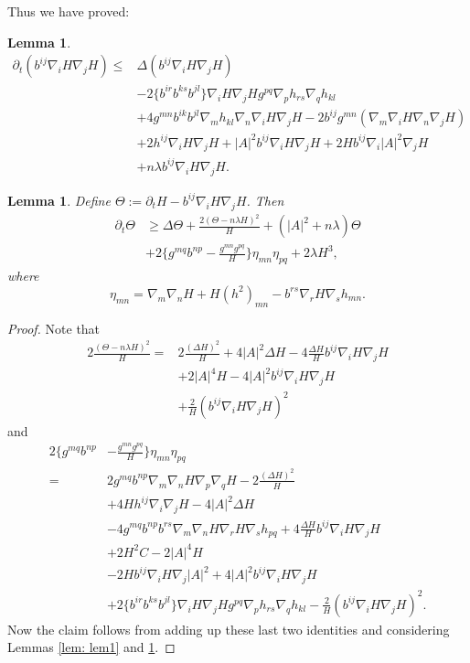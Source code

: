 \documentclass{amsart}
\newtheorem{lemma}[theorem]{Lemma}
\theoremstyle{definition}
\theoremstyle{remark}
\numberwithin{equation}{section}
\begin{document}
Thus we have proved:
\begin{lemma}\label{lem: lem2}
\begin{align*}
\partial_t(b^{ij}\nabla_iH\nabla_jH)\leq &\Delta (b^{ij}\nabla_iH\nabla_jH)\\
&-2\{b^{ir}b^{ks}b^{jl}\}\nabla_iH\nabla_jHg^{pq}\nabla_ph_{rs}\nabla_qh_{kl}\\
&+4g^{mn}b^{ik}b^{jl}\nabla_mh_{kl}\nabla_n\nabla_iH\nabla_jH-2b^{ij}g^{mn}(\nabla_m\nabla_iH\nabla_n\nabla_jH)\\
&+2h^{ij}\nabla_iH\nabla_jH+|A|^2b^{ij}\nabla_iH\nabla_jH+2Hb^{ij}\nabla_i|A|^2\nabla_jH\\
&+n\lambda b^{ij}\nabla_iH\nabla_jH.
\end{align*}
\end{lemma}
\begin{lemma}\label{lem: lema6}
Define $\Theta:=\partial_tH-b^{ij}\nabla_iH\nabla_jH$. Then
\begin{align*}
\partial_t\Theta&\geq\Delta \Theta+ \frac{2(\Theta-n\lambda H)^2}{H}+(|A|^2+n\lambda )\Theta\\
&+2\{g^{mq}b^{np}-\frac{g^{mn}g^{pq}}{H}\}\eta_{mn}\eta_{pq}+2\lambda H^3,
\end{align*}
where
\[\eta_{mn}=\nabla_m\nabla_nH+H(h^2)_{mn}-b^{rs}\nabla_rH\nabla_sh_{mn}.\]
\end{lemma}
\begin{proof}
Note that
\begin{align*}
2\frac{(\Theta-n\lambda H)^2}{H}=&2\frac{(\Delta H)^2}{H}+4|A|^2\Delta H-4\frac{\Delta H}{H}b^{ij}\nabla_iH\nabla_jH\\
&+2|A|^4H-4|A|^2b^{ij}\nabla_iH\nabla_jH\\
&+\frac{2}{H}\left(b^{ij}\nabla_iH\nabla_jH\right)^2
\end{align*}
and
\begin{align*}
2\{g^{mq}b^{np}&-\frac{g^{mn}g^{pq}}{H}\}\eta_{mn}\eta_{pq}\\
=&2g^{mq}b^{np}\nabla_m\nabla_nH\nabla_p\nabla_qH-2\frac{(\Delta H)^2}{H}\\
&+4Hh^{ij}\nabla_i\nabla_jH-4|A|^2\Delta H\\
&-4g^{mq}b^{np}b^{rs}\nabla_m\nabla_nH\nabla_rH\nabla_sh_{pq}+4\frac{\Delta H}{H}b^{ij}\nabla_iH\nabla_jH\\
&+2H^2C-2|A|^4H\\
&-2Hb^{ij}\nabla_iH\nabla_j|A|^2+4|A|^2b^{ij}\nabla_iH\nabla_jH\\
&+2\{b^{ir}b^{ks}b^{jl}\}\nabla_iH\nabla_jHg^{pq}\nabla_ph_{rs}\nabla_qh_{kl}-\frac{2}{H}\left(b^{ij}\nabla_iH\nabla_jH\right)^2.
\end{align*}
Now the claim follows from adding up these last two identities and considering Lemmas \ref{lem: lem1} and \ref{lem: lem2}.
\end{proof}
\end{document}
